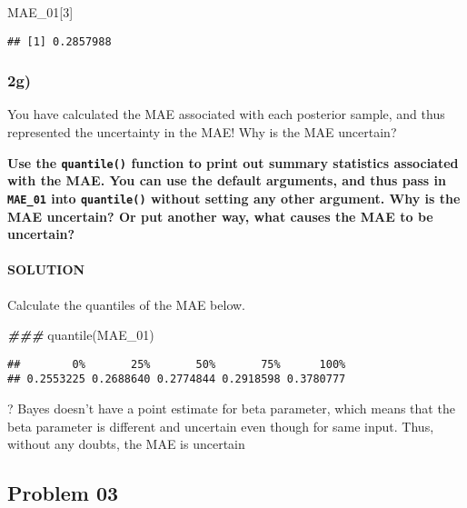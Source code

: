 \documentclass[
]{article}
\newenvironment{Shaded}{\begin{snugshade}}{\end{snugshade}}
\newcommand{\DecValTok}[1]{\textcolor[rgb]{0.00,0.00,0.81}{#1}}
\newcommand{\DocumentationTok}[1]{\textcolor[rgb]{0.56,0.35,0.01}{\textbf{\textit{#1}}}}
\newcommand{\FunctionTok}[1]{\textcolor[rgb]{0.00,0.00,0.00}{#1}}
\newcommand{\NormalTok}[1]{#1}
\begin{document}
\begin{Shaded}
\begin{Highlighting}[]
\NormalTok{MAE\_01[}\DecValTok{3}\NormalTok{]}
\end{Highlighting}
\end{Shaded}

\begin{verbatim}
## [1] 0.2857988
\end{verbatim}

\hypertarget{g}{%
\subsubsection{2g)}\label{g}}

You have calculated the MAE associated with each posterior sample, and
thus represented the uncertainty in the MAE! Why is the MAE uncertain?

\textbf{Use the \texttt{quantile()} function to print out summary
statistics associated with the MAE. You can use the default arguments,
and thus pass in \texttt{MAE\_01} into \texttt{quantile()} without
setting any other argument. Why is the MAE uncertain? Or put another
way, what causes the MAE to be uncertain?}

\hypertarget{solution-11}{%
\paragraph{SOLUTION}\label{solution-11}}

Calculate the quantiles of the MAE below.

\begin{Shaded}
\begin{Highlighting}[]
\DocumentationTok{\#\#\# }
\FunctionTok{quantile}\NormalTok{(MAE\_01)}
\end{Highlighting}
\end{Shaded}

\begin{verbatim}
##        0%       25%       50%       75%      100% 
## 0.2553225 0.2688640 0.2774844 0.2918598 0.3780777
\end{verbatim}

? Bayes doesn't have a point estimate for beta parameter, which means
that the beta parameter is different and uncertain even though for same
input. Thus, without any doubts, the MAE is uncertain

\hypertarget{problem-03}{%
\subsection{Problem 03}\label{problem-03}}
\end{document}
